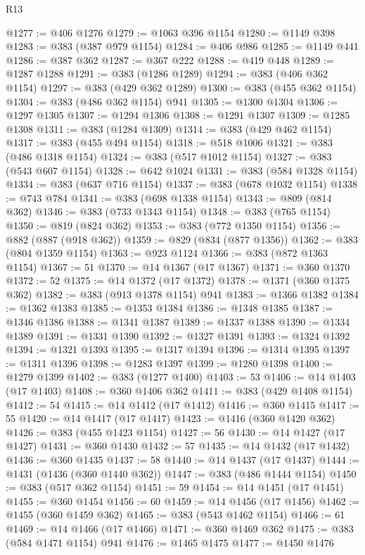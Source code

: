 \begin{lexlean}{R13}
\begin{coremodule}
{{{{{{{{{{{{{{{{{{{{{{{{{{{{{{{{{{{{{{{{{{{{{{{{{{{{{{@1277 := @406 @1276
@1279 := @1063 @396 @1154
@1280 := @1149 @398
@1283 := @383 (@387 @979 @1154)
@1284 := @406 @986
@1285 := @1149 @441
@1286 := @387 @362
@1287 := @367 @222
@1288 := @419 @448
@1289 := @1287 @1288
@1291 := @383 (@1286 @1289)
@1294 := @383 (@406 @362 @1154)
@1297 := @383 (@429 @362 @1289)
@1300 := @383 (@455 @362 @1154)
@1304 := @383 (@486 @362 @1154) @941
@1305 := @1300 @1304
@1306 := @1297 @1305
@1307 := @1294 @1306
@1308 := @1291 @1307
@1309 := @1285 @1308
@1311 := @383 (@1284 @1309)
@1314 := @383 (@429 @462 @1154)
@1317 := @383 (@455 @494 @1154)
@1318 := @518 @1006
@1321 := @383 (@486 @1318 @1154)
@1324 := @383 (@517 @1012 @1154)
@1327 := @383 (@543 @607 @1154)
@1328 := @642 @1024
@1331 := @383 (@584 @1328 @1154)
@1334 := @383 (@637 @716 @1154)
@1337 := @383 (@678 @1032 @1154)
@1338 := @743 @784
@1341 := @383 (@698 @1338 @1154)
@1343 := @809 (@814 @362)
@1346 := @383 (@733 @1343 @1154)
@1348 := @383 (@765 @1154)
@1350 := @819 (@824 @362)
@1353 := @383 (@772 @1350 @1154)
@1356 := @882 (@887 (@918 @362))
@1359 := @829 (@834 (@877 @1356))
@1362 := @383 (@804 @1359 @1154)
@1363 := @923 @1124
@1366 := @383 (@872 @1363 @1154)
@1367 := 51
@1370 := @14 @1367 (@17 @1367)
@1371 := @360 @1370
@1372 := 52
@1375 := @14 @1372 (@17 @1372)
@1378 := @1371 (@360 @1375 @362)
@1382 := @383 (@913 @1378 @1154) @941
@1383 := @1366 @1382
@1384 := @1362 @1383
@1385 := @1353 @1384
@1386 := @1348 @1385
@1387 := @1346 @1386
@1388 := @1341 @1387
@1389 := @1337 @1388
@1390 := @1334 @1389
@1391 := @1331 @1390
@1392 := @1327 @1391
@1393 := @1324 @1392
@1394 := @1321 @1393
@1395 := @1317 @1394
@1396 := @1314 @1395
@1397 := @1311 @1396
@1398 := @1283 @1397
@1399 := @1280 @1398
@1400 := @1279 @1399
@1402 := @383 (@1277 @1400)
@1403 := 53
@1406 := @14 @1403 (@17 @1403)
@1408 := @360 @1406 @362
@1411 := @383 (@429 @1408 @1154)
@1412 := 54
@1415 := @14 @1412 (@17 @1412)
@1416 := @360 @1415
@1417 := 55
@1420 := @14 @1417 (@17 @1417)
@1423 := @1416 (@360 @1420 @362)
@1426 := @383 (@455 @1423 @1154)
@1427 := 56
@1430 := @14 @1427 (@17 @1427)
@1431 := @360 @1430
@1432 := 57
@1435 := @14 @1432 (@17 @1432)
@1436 := @360 @1435
@1437 := 58
@1440 := @14 @1437 (@17 @1437)
@1444 := @1431 (@1436 (@360 @1440 @362))
@1447 := @383 (@486 @1444 @1154)
@1450 := @383 (@517 @362 @1154)
@1451 := 59
@1454 := @14 @1451 (@17 @1451)
@1455 := @360 @1454
@1456 := 60
@1459 := @14 @1456 (@17 @1456)
@1462 := @1455 (@360 @1459 @362)
@1465 := @383 (@543 @1462 @1154)
@1466 := 61
@1469 := @14 @1466 (@17 @1466)
@1471 := @360 @1469 @362
@1475 := @383 (@584 @1471 @1154) @941
@1476 := @1465 @1475
@1477 := @1450 @1476
}}}}}}}}}}}}}}}}}}}}}}}}}}}}}}}}}}}}}}}}}}}}}}}}}}}}}}
\end{coremodule}
\end{lexlean}
